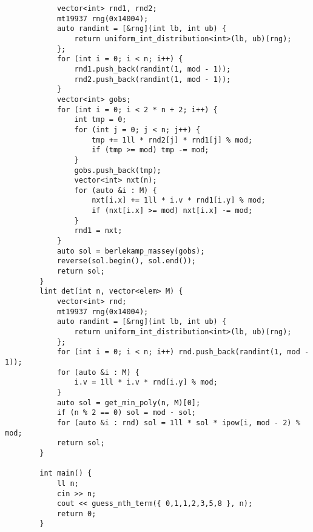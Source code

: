 \documentclass[landscape, 8pt, a4paper, oneside, twocolumn]{extarticle}
\begin{document}
\begin{verbatim}
			vector<int> rnd1, rnd2;
			mt19937 rng(0x14004);
			auto randint = [&rng](int lb, int ub) {
				return uniform_int_distribution<int>(lb, ub)(rng);
			};
			for (int i = 0; i < n; i++) {
				rnd1.push_back(randint(1, mod - 1));
				rnd2.push_back(randint(1, mod - 1));
			}
			vector<int> gobs;
			for (int i = 0; i < 2 * n + 2; i++) {
				int tmp = 0;
				for (int j = 0; j < n; j++) {
					tmp += 1ll * rnd2[j] * rnd1[j] % mod;
					if (tmp >= mod) tmp -= mod;
				}
				gobs.push_back(tmp);
				vector<int> nxt(n);
				for (auto &i : M) {
					nxt[i.x] += 1ll * i.v * rnd1[i.y] % mod;
					if (nxt[i.x] >= mod) nxt[i.x] -= mod;
				}
				rnd1 = nxt;
			}
			auto sol = berlekamp_massey(gobs);
			reverse(sol.begin(), sol.end());
			return sol;
		}
		lint det(int n, vector<elem> M) {
			vector<int> rnd;
			mt19937 rng(0x14004);
			auto randint = [&rng](int lb, int ub) {
				return uniform_int_distribution<int>(lb, ub)(rng);
			};
			for (int i = 0; i < n; i++) rnd.push_back(randint(1, mod - 1));
			for (auto &i : M) {
				i.v = 1ll * i.v * rnd[i.y] % mod;
			}
			auto sol = get_min_poly(n, M)[0];
			if (n % 2 == 0) sol = mod - sol;
			for (auto &i : rnd) sol = 1ll * sol * ipow(i, mod - 2) % mod;
			return sol;
		}
		
		int main() {
			ll n;
			cin >> n;
			cout << guess_nth_term({ 0,1,1,2,3,5,8 }, n);
			return 0;
		}
	\end{verbatim}
\end{document}
